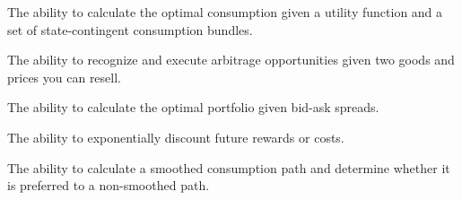 \begin{el}
    {The ability to calculate the optimal consumption given a utility function and a set of state-contingent consumption bundles.}
\end{el}

\begin{el}[Arbitrage]
    {The ability to recognize and execute arbitrage opportunities given two goods and prices you can resell.}
\end{el}

\begin{el}
    {The ability to calculate the optimal portfolio given bid-ask spreads.}
\end{el}

\begin{el}
    {The ability to exponentially discount future rewards or costs.}
\end{el}

\begin{el}\label{el:intertemporal_consumption_smoothing}
    {The ability to calculate a smoothed consumption path and determine whether it is preferred to a non-smoothed path.}
\end{el}


\subsection{\sixthParent}\label{setting:sixth}

